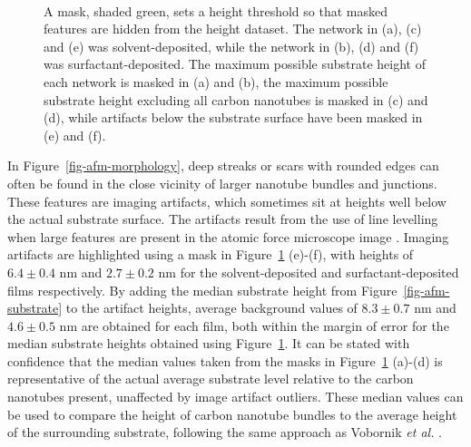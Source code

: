 \documentclass[
  a4paper,
]{scrbook}
\begin{document}
\begin{figure}
\begin{minipage}[t]{0.01\linewidth}
{\centering 

~

}

\end{minipage}%

\caption[Atomic force microscope images which have been masked
(highlighted green) below various threshold
heights.]{\label{fig-cnt-mask}A mask, shaded green, sets a height
threshold so that masked features are hidden from the height dataset.
The network in (a), (c) and (e) was solvent-deposited, while the network
in (b), (d) and (f) was surfactant-deposited. The maximum possible
substrate height of each network is masked in (a) and (b), the maximum
possible substrate height excluding all carbon nanotubes is masked in
(c) and (d), while artifacts below the substrate surface have been
masked in (e) and (f).}

\end{figure}

In Figure~\ref{fig-afm-morphology}, deep streaks or scars with rounded
edges can often be found in the close vicinity of larger nanotube
bundles and junctions. These features are imaging artifacts, which
sometimes sit at heights well below the actual substrate surface. The
artifacts result from the use of line levelling when large features are
present in the atomic force microscope image \autocite{Sinha2009}.
Imaging artifacts are highlighted using a mask in
Figure~\ref{fig-cnt-mask} (e)-(f), with heights of \(6.4 \pm 0.4\) nm
and \(2.7 \pm 0.2\) nm for the solvent-deposited and
surfactant-deposited films respectively. By adding the median substrate
height from Figure~\ref{fig-afm-substrate} to the artifact heights,
average background values of \(8.3 \pm 0.7\) nm and \(4.6 \pm 0.5\) nm
are obtained for each film, both within the margin of error for the
median substrate heights obtained using Figure~\ref{fig-cnt-mask}. It
can be stated with confidence that the median values taken from the
masks in Figure~\ref{fig-cnt-mask} (a)-(d) is representative of the
actual average substrate level relative to the carbon nanotubes present,
unaffected by image artifact outliers. These median values can be used
to compare the height of carbon nanotube bundles to the average height
of the surrounding substrate, following the same approach as Vobornik
\emph{et al.} \autocite{Vobornik2023}.
\end{document}
